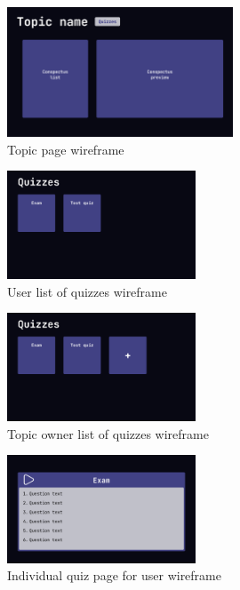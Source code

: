 \documentclass[
    english, %
]{VUMIFPSkursinis}
\begin{document}
\begin{figure}[ht]
    \centering
    \includegraphics[width=0.6\textwidth]{../lab3diags/Topic page.png}
    \caption{Topic page wireframe}
    \label{wireframe-topic-page}
\end{figure}

\pagebreak

\begin{figure}[ht]
    \centering
    \includegraphics[width=0.5\textwidth]{../lab3diags/Quiz list (User).png}
    \caption{User list of quizzes wireframe}
    \label{wireframe-quiz-list-user}
\end{figure}

\begin{figure}[ht]
    \centering
    \includegraphics[width=0.5\textwidth]{../lab3diags/Quiz list.png}
    \caption{Topic owner list of quizzes wireframe}
    \label{wireframe-quiz-list-topic-owner}
\end{figure}

\begin{figure}[ht]
    \centering
    \includegraphics[width=0.5\textwidth]{../lab3diags/Individual quiz (User).png}
    \caption{Individual quiz page for user wireframe}
    \label{wireframe-quiz-page-user}
\end{figure}
\end{document}
